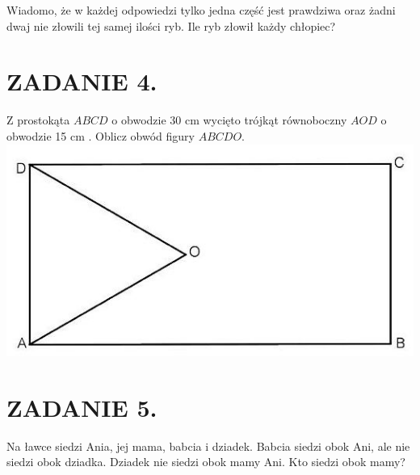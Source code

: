 \documentclass[10pt]{article}
\begin{document}
Wiadomo, że w każdej odpowiedzi tylko jedna część jest prawdziwa oraz żadni dwaj nie złowili tej samej ilości ryb. Ile ryb złowił każdy chłopiec?

\section*{ZADANIE 4.}
Z prostokąta \(A B C D\) o obwodzie 30 cm wycięto trójkąt równoboczny \(A O D\) o obwodzie 15 cm . Oblicz obwód figury \(A B C D O\).\\
\includegraphics[max width=\textwidth, center]{2024_11_21_67b4ce0009b19a2ea4b2g-1(1)}

\section*{ZADANIE 5.}
Na ławce siedzi Ania, jej mama, babcia i dziadek. Babcia siedzi obok Ani, ale nie siedzi obok dziadka. Dziadek nie siedzi obok mamy Ani. Kto siedzi obok mamy?
\end{document}
